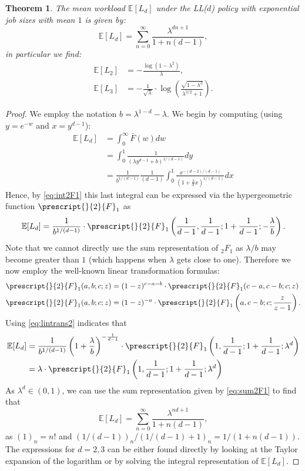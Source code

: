 \documentclass[12pt]{report}
\newcommand{\E}{\mathbb{E}}
\newtheorem{theorem}{Theorem}
\begin{document}
\begin{theorem}\label{th:Wd}
The mean workload $\E[L_d]$ under the LL($d$) policy with exponential job sizes with mean $1$
is given by:
\begin{equation}\label{W_d}
\E[L_d] = \sum_{n=0}^{\infty} \frac{\lambda^{dn+1}}{1 + n(d-1)},
\end{equation}
in particular we find:
\begin{align*}
\E[L_2] &= - \frac{\log\left( 1 - \lambda ^ 2 \right)}{\lambda},\\
\E[L_3] &= - \frac{1}{\sqrt{\lambda}} \cdot \log\left( \frac{\sqrt{1 - \lambda^3}}{\lambda^{3/2} + 1} \right).
\end{align*}
\end{theorem}
\begin{proof}
We employ the notation $b = \lambda^{1-d} - \lambda$. 
We begin by computing (using $y=e^{-w}$ and $x=y^{d-1}$):
\begin{align*}
\E[L_d] &= \int_0^\infty \bar{F}(w)dw\\
&=  \int_0^1 \frac{1}{(\lambda y^{d-1} + b)^{1/(d-1)}} dy\\
&=  \frac{1}{b^{1/(d-1)}} \frac{1}{(d-1)} \int_0^1 \frac{x^{-(d-2)/(d-1)}}{(1+\frac{\lambda}{b} x)^{1/(d-1)}} dx
\end{align*}
Hence, by \eqref{eq:int2F1} this last integral can be expressed via the hypergeometric function $\prescript{}{2}{F}_1$ as 
$$
\E[L_d] = \frac{1}{b^{1/(d-1)}}\cdot \prescript{}{2}{F}_1\left( \frac{1}{d-1}, \frac{1}{d-1}; 1 + \frac{1}{d-1}; -\frac{\lambda}{b}\right).
$$
Note that we cannot directly use the sum representation of $_2F_1$ as $\lambda / b$ may become greater than $1$ (which happens when 
$\lambda$ gets close to one). Therefore we now employ the well-known linear transformation formulas:
\begin{align}
\prescript{}{2}{F}_1(a,b;c;z) & = (1-z)^{c-a-b} \cdot  \prescript{}{2}{F}_1(c-a, c-b; c; z) \nonumber\\
\prescript{}{2}{F}_1(a,b;c;z) & = (1-z)^{-a} \cdot  \prescript{}{2}{F}_1\left(a,c-b;c;\frac{z}{z-1}\right).
\label{eq:lintrans2}
\end{align}
Using \eqref{eq:lintrans2} indicates that
\begin{align*}
\E[L_d] & = \frac{1}{b^{1/(d-1)}} \left(1+\frac{\lambda}{b}  \right)^{-\frac{1}{d-1}} \cdot  \prescript{}{2}{F}_1\left( 1,\frac{1}{d-1};1+\frac{1}{d-1};\lambda^d \right) \\
& = \lambda \cdot \prescript{}{2}{F}_1\left( 1,\frac{1}{d-1};1+\frac{1}{d-1};\lambda^d \right) 
\end{align*}
As $\lambda^d \in (0,1)$, we can use the sum representation given by \eqref{eq:sum2F1} to find that
$$
\E[L_d] =\sum_{n=0}^{\infty} \frac{\lambda^{nd+1}}{1 + n (d-1)},
$$
as $(1)_n = n!$ and $(1/(d-1))_n/(1/(d-1)+1)_n = 1/(1+n(d-1))$.
The expressions for $d=2,3$ can be either found directly by looking at the Taylor expansion of the logarithm or by solving the integral representation of $\E[L_d]$.
\end{proof}
\end{document}
